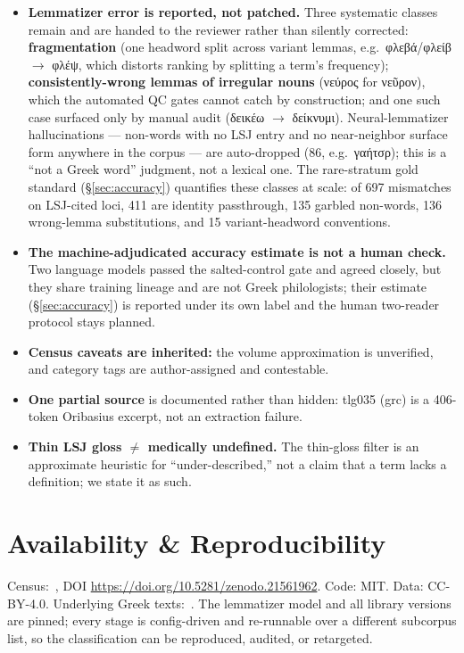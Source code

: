 \documentclass[11pt]{article}
\begin{document}
\begin{itemize}[leftmargin=*,itemsep=3pt]
\item \textbf{Lemmatizer error is reported, not patched.} Three systematic classes remain and are handed to
  the reviewer rather than silently corrected: \textbf{fragmentation} (one headword split across variant
  lemmas, e.g.\ φλεβά/φλείβ $\rightarrow$ φλέψ, which distorts ranking by splitting a term's frequency);
  \textbf{consistently-wrong lemmas of irregular nouns} (νεύρος for νεῦρον), which the automated QC gates
  cannot catch by construction; and one such case surfaced only by manual audit (δεικέω $\rightarrow$ δείκνυμι).
  Neural-lemmatizer hallucinations --- non-words with no LSJ entry and no near-neighbor surface form
  anywhere in the corpus --- are auto-dropped (86, e.g.\ γαήτσρ); this is a ``not a Greek word''
  judgment, not a lexical one. The rare-stratum gold standard (\S\ref{sec:accuracy}) quantifies
  these classes at scale: of 697 mismatches on LSJ-cited loci, 411 are identity passthrough, 135
  garbled non-words, 136 wrong-lemma substitutions, and 15 variant-headword conventions.
\item \textbf{The machine-adjudicated accuracy estimate is not a human check.} Two language
  models passed the salted-control gate and agreed closely, but they share training lineage and
  are not Greek philologists; their estimate (\S\ref{sec:accuracy}) is reported under its own
  label and the human two-reader protocol stays planned.
\item \textbf{Census caveats are inherited:} the volume approximation is unverified, and category tags are
  author-assigned and contestable.
\item \textbf{One partial source} is documented rather than hidden: tlg035 (grc) is a 406-token Oribasius
  excerpt, not an extraction failure.
\item \textbf{Thin LSJ gloss $\neq$ medically undefined.} The thin-gloss filter is an approximate heuristic for
  ``under-described,'' not a claim that a term lacks a definition; we state it as such.
\end{itemize}

\section{Availability \& Reproducibility}
\label{sec:availability}

Census:~\citep{pepperman-2026-galen-census}, DOI
\url{https://doi.org/10.5281/zenodo.21561962}. Code: MIT. Data: CC-BY-4.0.
Underlying Greek texts:~\citep{first1kgreek}. The lemmatizer model and all library versions are pinned;
every stage is config-driven and re-runnable over a different subcorpus list, so the classification
can be reproduced, audited, or retargeted.
\end{document}
